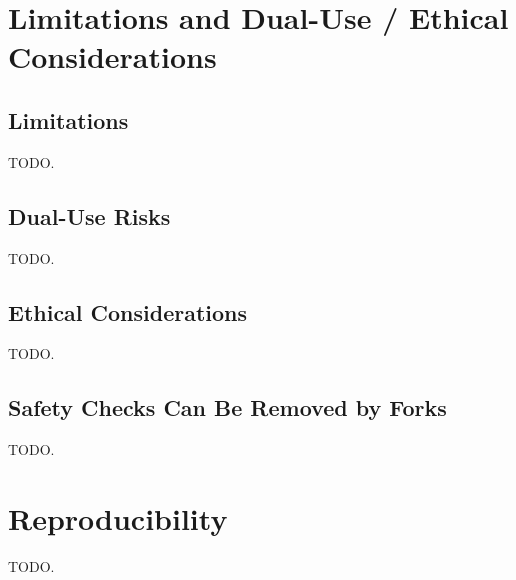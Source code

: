\documentclass[11pt]{article}
\begin{document}
\appendix

\section{Limitations and Dual-Use / Ethical Considerations}

\subsection{Limitations}
TODO.

\subsection{Dual-Use Risks}
TODO.

\subsection{Ethical Considerations}
TODO.

\subsection{Safety Checks Can Be Removed by Forks}
TODO.

\section{Reproducibility}
TODO.
\end{document}
